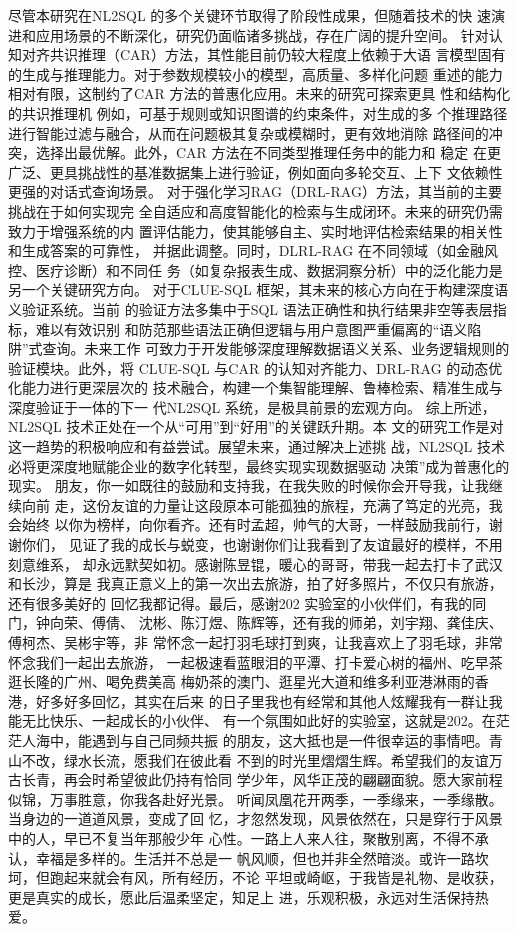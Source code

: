 \documentclass[12pt,a4paper,openright,UTF8]{ctexbook}
\begin{document}
尽管本研究在NL2SQL 的多个关键环节取得了阶段性成果，但随着技术的快 速演进和应用场景的不断深化，研究仍面临诸多挑战，存在广阔的提升空间。 针对认知对齐共识推理（CAR）方法，其性能目前仍较大程度上依赖于大语 言模型固有的生成与推理能力。对于参数规模较小的模型，高质量、多样化问题 重述的能力相对有限，这制约了CAR 方法的普惠化应用。未来的研究可探索更具 性和结构化的共识推理机 例如，可基于规则或知识图谱的约束条件，对生成的多 个推理路径进行智能过滤与融合，从而在问题极其复杂或模糊时，更有效地消除 路径间的冲突，选择出最优解。此外，CAR 方法在不同类型推理任务中的能力和 稳定 在更广泛、更具挑战性的基准数据集上进行验证，例如面向多轮交互、上下 文依赖性更强的对话式查询场景。 对于强化学习RAG（DRL-RAG）方法，其当前的主要挑战在于如何实现完 全自适应和高度智能化的检索与生成闭环。未来的研究仍需致力于增强系统的内 置评估能力，使其能够自主、实时地评估检索结果的相关性和生成答案的可靠性， 并据此调整。同时，DLRL-RAG 在不同领域（如金融风控、医疗诊断）和不同任 务（如复杂报表生成、数据洞察分析）中的泛化能力是另一个关键研究方向。 对于CLUE-SQL 框架，其未来的核心方向在于构建深度语义验证系统。当前 的验证方法多集中于SQL 语法正确性和执行结果非空等表层指标，难以有效识别 和防范那些语法正确但逻辑与用户意图严重偏离的“语义陷阱”式查询。未来工作 可致力于开发能够深度理解数据语义关系、业务逻辑规则的验证模块。此外，将 CLUE-SQL 与CAR 的认知对齐能力、DRL-RAG 的动态优化能力进行更深层次的 技术融合，构建一个集智能理解、鲁棒检索、精准生成与深度验证于一体的下一 代NL2SQL 系统，是极具前景的宏观方向。 综上所述，NL2SQL 技术正处在一个从“可用”到“好用”的关键跃升期。本 文的研究工作是对这一趋势的积极响应和有益尝试。展望未来，通过解决上述挑 战，NL2SQL 技术必将更深度地赋能企业的数字化转型，最终实现实现数据驱动 决策”成为普惠化的现实。 朋友，你一如既往的鼓励和支持我，在我失败的时候你会开导我，让我继续向前 走，这份友谊的力量让这段原本可能孤独的旅程，充满了笃定的光亮，我会始终 以你为榜样，向你看齐。还有时孟超，帅气的大哥，一样鼓励我前行，谢谢你们， 见证了我的成长与蜕变，也谢谢你们让我看到了友谊最好的模样，不用刻意维系， 却永远默契如初。感谢陈昱锟，暖心的哥哥，带我一起去打卡了武汉和长沙，算是 我真正意义上的第一次出去旅游，拍了好多照片，不仅只有旅游，还有很多美好的 回忆我都记得。最后，感谢202 实验室的小伙伴们，有我的同门，钟向荣、傅倩、 沈彬、陈汀煜、陈辉等，还有我的师弟，刘宇翔、龚佳庆、傅柯杰、吴彬宇等，非 常怀念一起打羽毛球打到爽，让我喜欢上了羽毛球，非常怀念我们一起出去旅游， 一起极速看蓝眼泪的平潭、打卡爱心树的福州、吃早茶逛长隆的广州、喝免费美高 梅奶茶的澳门、逛星光大道和维多利亚港淋雨的香港，好多好多回忆，其实在后来 的日子里我也有经常和其他人炫耀我有一群让我能无比快乐、一起成长的小伙伴、 有一个氛围如此好的实验室，这就是202。在茫茫人海中，能遇到与自己同频共振 的朋友，这大抵也是一件很幸运的事情吧。青山不改，绿水长流，愿我们在彼此看 不到的时光里熠熠生辉。希望我们的友谊万古长青，再会时希望彼此仍持有恰同 学少年，风华正茂的翩翩面貌。愿大家前程似锦，万事胜意，你我各赴好光景。 听闻凤凰花开两季，一季缘来，一季缘散。当身边的一道道风景，变成了回 忆，才忽然发现，风景依然在，只是穿行于风景中的人，早已不复当年那般少年 心性。一路上人来人往，聚散别离，不得不承认，幸福是多样的。生活并不总是一 帆风顺，但也并非全然暗淡。或许一路坎坷，但跑起来就会有风，所有经历，不论 平坦或崎岖，于我皆是礼物、是收获，更是真实的成长，愿此后温柔坚定，知足上 进，乐观积极，永远对生活保持热爱。 
\end{document}
